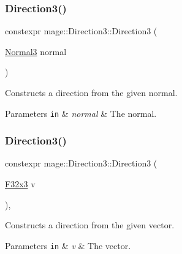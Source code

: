 \subsubsection{\texorpdfstring{Direction3()}{Direction3()}\hspace{0.1cm}{\footnotesize\ttfamily [5/6]}}
{\footnotesize\ttfamily constexpr mage\+::\+Direction3\+::\+Direction3 (\begin{DoxyParamCaption}\item[{\hyperlink{structmage_1_1_normal3}{Normal3}}]{normal }\end{DoxyParamCaption})\hspace{0.3cm}{\ttfamily [noexcept]}}

Constructs a direction from the given normal.


\begin{DoxyParams}[1]{Parameters}
\mbox{\tt in}  & {\em normal} & The normal. \\
\hline
\end{DoxyParams}
\hypertarget{structmage_1_1_direction3_a9ef3fe2fd9fd55fade378d42eda597c3}{}\label{structmage_1_1_direction3_a9ef3fe2fd9fd55fade378d42eda597c3} 
\subsubsection{\texorpdfstring{Direction3()}{Direction3()}\hspace{0.1cm}{\footnotesize\ttfamily [6/6]}}
{\footnotesize\ttfamily constexpr mage\+::\+Direction3\+::\+Direction3 (\begin{DoxyParamCaption}\item[{\hyperlink{namespacemage_a73fbe0da4b8d5bc156bb8453e5b63a17}{F32x3}}]{v }\end{DoxyParamCaption})\hspace{0.3cm}{\ttfamily [explicit]}, {\ttfamily [noexcept]}}

Constructs a direction from the given vector.


\begin{DoxyParams}[1]{Parameters}
\mbox{\tt in}  & {\em v} & The vector. \\
\hline
\end{DoxyParams}
\hypertarget{structmage_1_1_direction3_a583c087dc366d206aaf54a33bc90c50b}{}\label{structmage_1_1_direction3_a583c087dc366d206aaf54a33bc90c50b} 
